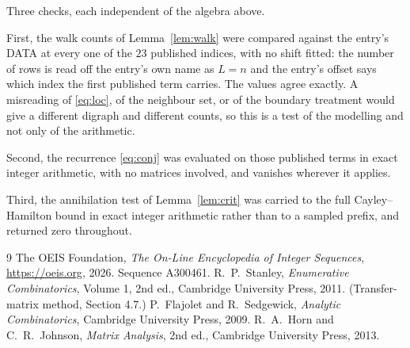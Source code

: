 \documentclass[11pt,a4paper]{article}
\theoremstyle{plain}
\theoremstyle{definition}
\begin{document}
Three checks, each independent of the algebra above.

First, the walk counts of Lemma~\ref{lem:walk} were compared against the entry's DATA at
every one of the $23$ published indices, with no shift fitted: the number of rows is
read off the entry's own name as $L=n$ and the entry's offset says which index the first
published term carries. The values agree exactly. A misreading of \eqref{eq:loc}, of the
neighbour set, or of the boundary treatment would give a different digraph and different
counts, so this is a test of the modelling and not only of the arithmetic.

Second, the recurrence \eqref{eq:conj} was evaluated on those published terms in exact
integer arithmetic, with no matrices involved, and vanishes wherever it applies.

Third, the annihilation test of Lemma~\ref{lem:crit} was carried to the full
Cayley--Hamilton bound in exact integer arithmetic rather than to a sampled prefix, and
returned zero throughout.

\begin{thebibliography}{9}
 The OEIS Foundation, \emph{The On-Line Encyclopedia of Integer
Sequences}, \url{https://oeis.org}, 2026. Sequence A300461.
 R.~P.~Stanley, \emph{Enumerative Combinatorics}, Volume 1, 2nd ed.,
Cambridge University Press, 2011. (Transfer-matrix method, Section 4.7.)
 P.~Flajolet and R.~Sedgewick, \emph{Analytic Combinatorics}, Cambridge
University Press, 2009.
 R.~A.~Horn and C.~R.~Johnson, \emph{Matrix Analysis}, 2nd ed., Cambridge
University Press, 2013.
\end{thebibliography}
\end{document}
